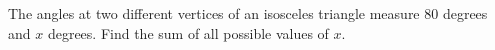 The angles at two different vertices of an isosceles triangle measure 80 degrees and $x$ degrees. Find the sum of all possible values of $x$.
